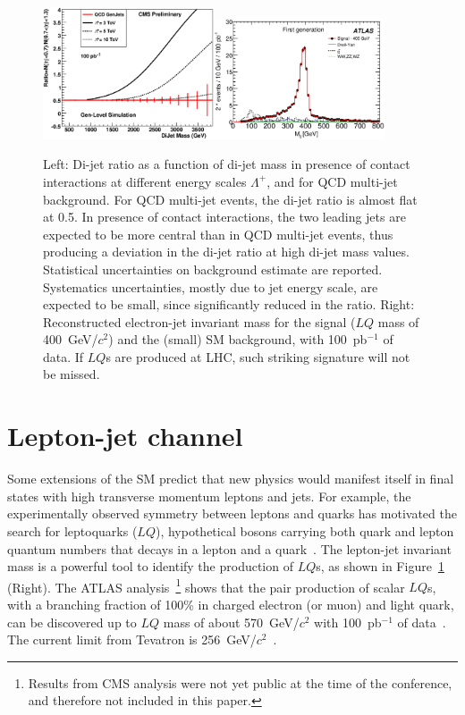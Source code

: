 \documentclass{cimento}
\begin{document}
\begin{figure}[htbp] 
\centering
\includegraphics[width=0.45\textwidth]{DiJetRatio100pbOptFix.eps}\includegraphics[width=0.45\textwidth]{Mejfig5R.eps}  
\caption{Left: Di-jet ratio as a function of di-jet mass in presence of 
contact interactions at different energy scales $\Lambda^{+}$, 
and for QCD multi-jet background. 
For QCD multi-jet events, the di-jet ratio is almost flat at 0.5. 
In presence of contact interactions, the two 
leading jets are expected to be more central than in QCD multi-jet events, 
thus producing a deviation in the di-jet ratio at high di-jet mass values.
Statistical uncertainties on background estimate are reported.  
Systematics uncertainties, mostly due to jet energy scale, are expected to be small, 
since significantly reduced in the ratio.
Right: Reconstructed electron-jet invariant mass for the signal 
($LQ$ mass of 400~GeV/$c^2$) and the (small) SM background, 
with 100~pb$^{-1}$ of data. If $LQ$s are produced at LHC, 
such striking signature will not be missed.}
\label{fig:DiJetRatioAndLQMej}
\end{figure}

\section{Lepton-jet channel} \label{leptonjet}
Some extensions of the SM predict that new physics would manifest itself in 
final states with high transverse momentum leptons and jets.
For example, the experimentally observed symmetry between 
leptons and quarks has motivated the search for leptoquarks ($LQ$), 
hypothetical bosons carrying both quark and lepton quantum numbers 
that decays in a lepton and a quark~\cite{Acosta:1999ws}.
The lepton-jet invariant mass is a powerful tool to identify the production 
of $LQ$s, as shown in Figure~\ref{fig:DiJetRatioAndLQMej} (Right). 
The ATLAS analysis~\footnote{Results from CMS analysis were not yet public at the time 
of the conference, and therefore not included in this paper.} 
shows that the pair production of scalar $LQ$s, with a branching fraction of 100\% 
in charged electron (or muon) and light quark, can be discovered up to $LQ$ 
mass of about 570~GeV/$c^2$ with 100~pb$^{-1}$ of data~\cite{LQATLAS}. 
The current limit from Tevatron is 256~GeV/$c^2$~\cite{Abazov:2004mk}.
\end{document}
